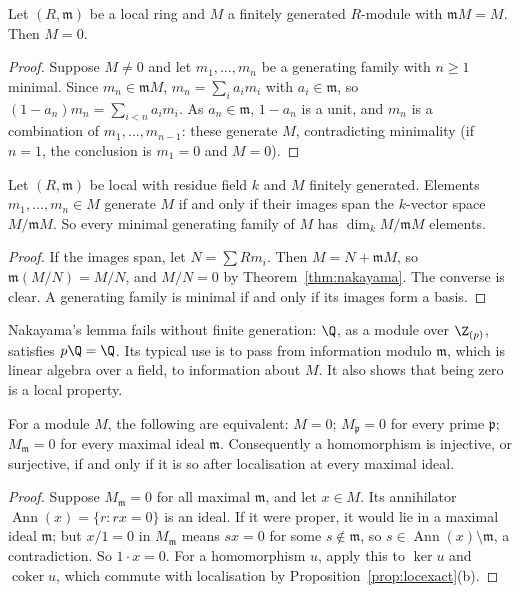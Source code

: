 \begin{theorem}\label{thm:nakayama}
Let $(R,\mathfrak m)$ be a local ring and $M$ a finitely generated $R$-module with $\mathfrak mM=M$. Then $M=0$.
\end{theorem}

\begin{proof}
Suppose $M\ne0$ and let $m_1,\dots,m_n$ be a generating family with $n\ge1$ minimal. Since $m_n\in\mathfrak mM$, $m_n=\sum_ia_im_i$ with $a_i\in\mathfrak m$, so $(1-a_n)m_n=\sum_{i<n}a_im_i$. As $a_n\in\mathfrak m$, $1-a_n$ is a unit, and
$m_n$ is a combination of $m_1,\dots,m_{n-1}$: these generate $M$, contradicting minimality (if $n=1$, the conclusion is $m_1=0$ and $M=0$).
\end{proof}

\begin{corollary}\label{cor:mingens}
Let $(R,\mathfrak m)$ be local with residue field $k$ and $M$ finitely generated. Elements $m_1,\dots,m_n\in M$ generate $M$ if and only if their images span the $k$-vector space $M/\mathfrak mM$. So every minimal generating family of
$M$ has $\dim_kM/\mathfrak mM$ elements.
\end{corollary}

\begin{proof}
If the images span, let $N=\sum Rm_i$. Then $M=N+\mathfrak mM$, so $\mathfrak m(M/N)=M/N$, and $M/N=0$ by Theorem~\ref{thm:nakayama}. The converse is clear. A generating family is minimal if and only if its images form a basis.
\end{proof}

Nakayama's lemma fails without finite generation: $\Q$, as a module over $\Z_{(p)}$, satisfies $p\Q=\Q$. Its typical use is to pass from information modulo $\mathfrak m$, which is linear algebra over a field, to
information about $M$. It also shows that being zero is a local property.

\begin{proposition}\label{prop:localzero}
For a module $M$, the following are equivalent: $M=0$; $M_{\mathfrak p}=0$ for every prime $\mathfrak p$; $M_{\mathfrak m}=0$ for every maximal ideal $\mathfrak m$. Consequently a homomorphism is injective, or surjective, if and only if
it is so after localisation at every maximal ideal.
\end{proposition}

\begin{proof}
Suppose $M_{\mathfrak m}=0$ for all maximal $\mathfrak m$, and let $x\in M$. Its annihilator $\operatorname{Ann}(x)=\{r:rx=0\}$ is an ideal. If it were proper, it would lie in a maximal ideal $\mathfrak m$; but $x/1=0$ in $M_{\mathfrak m}$ means
$sx=0$ for some $s\notin\mathfrak m$, so $s\in\operatorname{Ann}(x)\setminus\mathfrak m$, a contradiction. So $1\cdot x=0$. For a homomorphism $u$, apply this to $\ker u$ and $\operatorname{coker}u$, which commute with localisation by
Proposition~\ref{prop:locexact}(b).
\end{proof}


